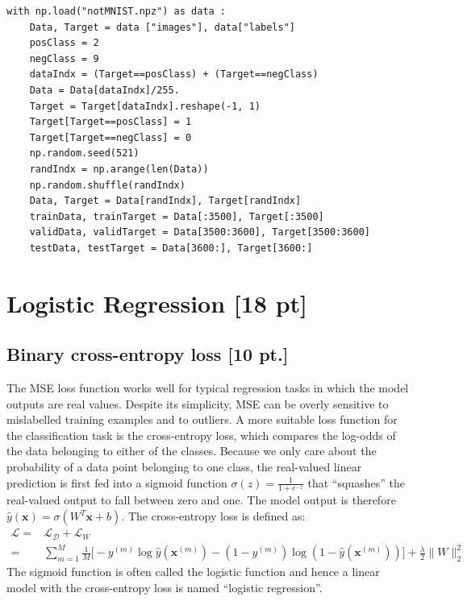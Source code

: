 \documentclass[12pt,letterpaper]{article}
\begin{document}
\begin{verbatim}
with np.load("notMNIST.npz") as data :
    Data, Target = data ["images"], data["labels"]
    posClass = 2
    negClass = 9
    dataIndx = (Target==posClass) + (Target==negClass)
    Data = Data[dataIndx]/255.
    Target = Target[dataIndx].reshape(-1, 1)
    Target[Target==posClass] = 1
    Target[Target==negClass] = 0
    np.random.seed(521)
    randIndx = np.arange(len(Data))
    np.random.shuffle(randIndx)
    Data, Target = Data[randIndx], Target[randIndx]
    trainData, trainTarget = Data[:3500], Target[:3500]
    validData, validTarget = Data[3500:3600], Target[3500:3600]
    testData, testTarget = Data[3600:], Target[3600:]
\end{verbatim}


\section{Logistic Regression [18 pt]}

\subsection{Binary cross-entropy loss [10 pt.]}

The MSE loss function works well for typical regression tasks in which the model outputs are real values. Despite its simplicity, MSE can be overly sensitive to mislabelled training examples and to outliers. A more suitable loss function for the classification task is the cross-entropy loss, which compares the log-odds of the data belonging to either of the classes. Because we only care about the probability of a data point belonging to one class, the real-valued linear prediction is first fed into a sigmoid function $\sigma(z) = \frac{1}{1+e^{-z}}$ that ``squashes'' the real-valued output to fall between zero and one. The model output is therefore $\hat{y}(\mathbf{x}) = \sigma(W^T\mathbf{x} + b)$. The cross-entropy loss is defined as:
\begin{align*}
  \mathcal{L} =& \mathcal{L}_{\mathcal{D}} + \mathcal{L}_W \\ =& \sum_{m=1}^M \frac{1}{M} \bigg[-{y}^{(m)}\log\hat{y}(\mathbf{x}^{(m)}) - (1-{y}^{(m)})\log(1-\hat{y}(\mathbf{x}^{(m)}))\bigg]
   + \frac{\lambda}{2} \|W\|^2_2
\end{align*}
The sigmoid function is often called the logistic function and hence a linear model with the cross-entropy loss is named ``logistic regression''. 
\end{document}
